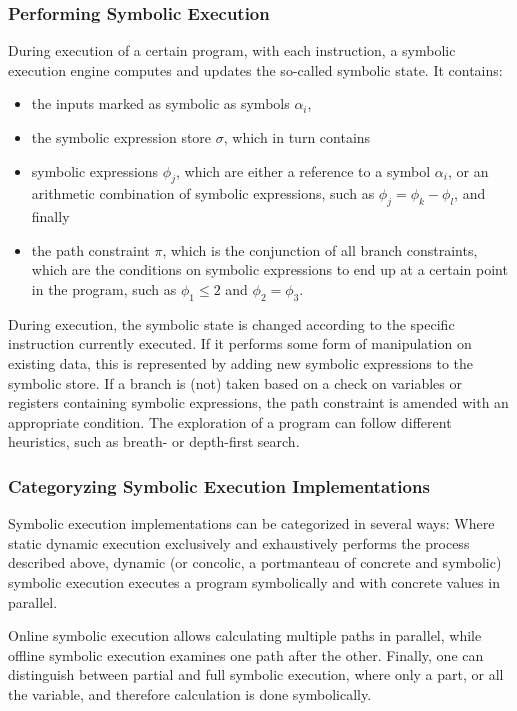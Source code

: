 \documentclass{article}
\begin{document}
\begin{multicols}{2}
    \subsubsection{Performing Symbolic Execution}
    During execution of a certain program, with each instruction, a symbolic execution engine computes and updates the so-called symbolic state. It contains:
    \begin{itemize}
        \item the inputs marked as symbolic as symbols $\alpha_i$,
        \item the symbolic expression store $\sigma$, which in turn contains
        \item symbolic expressions $\phi_j$, which are either a reference to a symbol $\alpha_i$, or an arithmetic combination of symbolic expressions, such as $\phi_j=\phi_k-\phi_l$, and finally
        \item the path constraint $\pi$, which is the conjunction of all branch constraints, which are the conditions on symbolic expressions to end up at a certain point in the program, such as $\phi_1\leq2$ and $\phi_2=\phi_3$.
    \end{itemize}

    During execution, the symbolic state is changed according to the specific instruction currently executed. If it performs some form of manipulation on existing data, this is represented by adding new symbolic expressions to the symbolic store. If a branch is (not) taken based on a check on variables or registers containing symbolic expressions, the path constraint is amended with an appropriate condition. The exploration of a program can follow different heuristics, such as breath- or depth-first search.

    \subsubsection{Categoryzing Symbolic Execution Implementations}
    Symbolic execution implementations can be categorized in several ways: Where static dynamic execution exclusively and exhaustively performs the process described above, dynamic (or concolic, a portmanteau of concrete and symbolic) symbolic execution executes a program symbolically and with concrete values in parallel.

    Online symbolic execution allows calculating multiple paths in parallel, while offline symbolic execution examines one path after the other. Finally, one can distinguish between partial and full symbolic execution, where only a part, or all the variable, and therefore calculation is done symbolically.\cite{Ghidrion}


\end{multicols}
\end{document}
